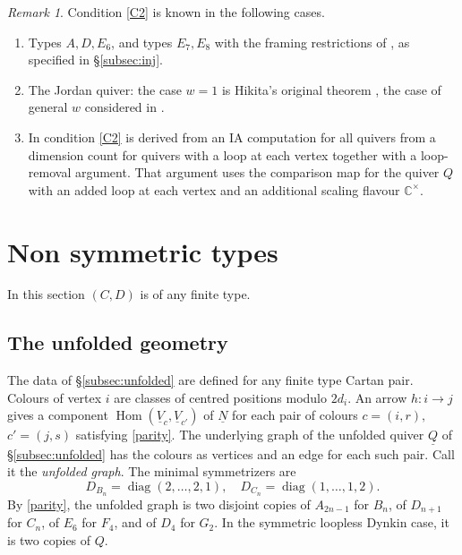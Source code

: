 \documentclass[11pt,reqno]{amsart}
\theoremstyle{definition}
\theoremstyle{remark}
\newtheorem{Remark}[Theorem]{Remark}
\def\bbC{\mathbb C}
\def\dN{\underline N}
\def\dV{\underline V}
\def\dQ{\underline Q}
\def\B{\mathrm B}
\def\Hom{\operatorname{Hom}}
\def\M{\mathfrak M}
\begin{document}
\begin{Remark} \label{rem:gen-C2} Condition \eqref{C2} is known in the following cases.\hfill
\begin{enumerate}[label=$\mathrm{(\alph*)}$,leftmargin=8mm]
\item Types $A,D,E_6$, and types $E_7,E_8$ with the framing
restrictions of \cite[Cor.~2.17, Rem.~2.18, Thm.~A.7]{DK25},
as specified in \S\ref{subsec:inj}. 
\item The Jordan quiver: the case $w=1$ is Hikita's original theorem \cite{Hik17}, the case
of general $w$ considered in \cite{KS24}. 
\item  In \cite{HikNotes} condition \eqref{C2} is derived from an IA computation for all quivers from a dimension count for
quivers with a loop at each vertex together with a loop-removal argument. 
That argument uses the comparison map for the quiver $Q$ with an added loop at each vertex and an additional scaling flavour 
$\bbC^\times$. 
%
\end{enumerate}
\end{Remark}



\section{Non symmetric types}\label{sec:ns}

In this section $(C,D)$ is of any finite type.



\subsection{The unfolded geometry}\label{subsec:ns-geom}
The data of \S\ref{subsec:unfolded} are defined for any finite type Cartan pair. 
Colours of vertex $i$ are classes of centred positions modulo $2d_i$.
An arrow $h:i\to j$ gives a component $\Hom(\dV_c,\dV_{c'})$ of $\dN$ for each pair of colours 
$c=(i,r),$ $c'=(j,s)$ satisfying \eqref{parity}. 
The underlying graph of the unfolded quiver $\dQ$ of \S\ref{subsec:unfolded} has the colours as vertices and an
edge for each such pair. Call it the \emph{unfolded graph}.
The minimal symmetrizers are
\[
 D_{B_n}=\operatorname{diag}({2,\ldots,2},1),\quad
 D_{C_n}=\operatorname{diag}({1,\ldots,1},2).
\]
By \eqref{parity}, the unfolded graph is two disjoint copies of
$A_{2n-1}$ for $B_n$, of $D_{n+1}$ for $C_n$,
of $E_6$ for $F_4$, and of $D_4$ for $G_2$.
In the symmetric loopless Dynkin case, it is two copies of $Q$.
\end{document}
